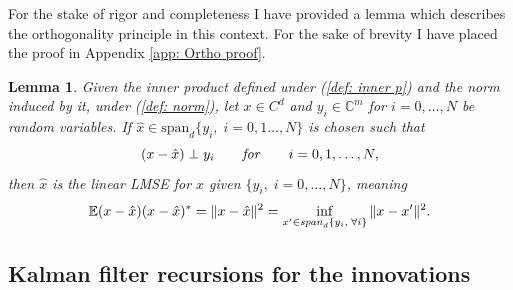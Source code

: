 \documentclass[12pt]{amsart}
\newcommand{\E}{\mathbb{E}}
\newcommand{\C}{\mathbb{C}}
\newtheorem{lemma}{Lemma}
\begin{document}
For the stake of rigor and completeness I have provided a lemma which describes the orthogonality principle in this context. For the sake of brevity I have placed the proof in Appendix \ref{app: Ortho proof}.

\begin{lemma}
	\label{lem: otho p}
	Given the inner product defined under (\ref{def: inner p}) and the norm induced by it, under (\ref{def: norm}), let $x\in C^d$ and $y_i \in \C^m$ for $i=0,\dots,N$ be random variables. If $\hat x\in \text{span}_d\{y_i,\;i=0,1\dots,N\}$ is chosen such that \begin{equation}
	(x-\hat x) \perp y_i \qquad\text{\emph{for}}\qquad i=0,1,\dots,N,
	\end{equation}
	then $\hat x$ is the linear LMSE for $x$ given $\{y_i,\;i=0,\dots,N\}$, meaning
	$$\E(x-\hat x)(x-\hat x)^* = \|x-\hat x\|^2 = \inf_{x'\in \text{\emph{span}}_d\{y_i,\;\forall i\}} \|x-x'\|^2.$$
\end{lemma}


\subsection{Kalman filter recursions for the innovations}
\end{document}

